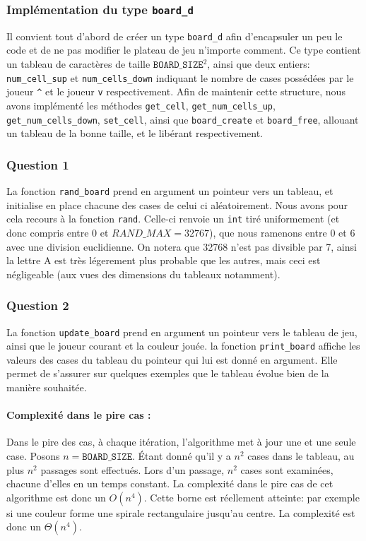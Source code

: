 \documentclass[12pt,a4paper,twoside]{article}
\begin{document}
\subsubsection*{Implémentation du type \texttt{board\_d}}
Il convient tout d'abord de créer un type \texttt{board\_d} afin
d'encapsuler un peu le code et de ne pas modifier le plateau de jeu
n'importe comment. Ce type contient un tableau de caractères de taille
\(\texttt{BOARD\_SIZE} ^{2}\), ainsi que deux entiers:
\texttt{num\_cell\_sup} et \texttt{num\_cells\_down} indiquant le nombre de
cases possédées par le joueur \texttt{\^} et le joueur \texttt{v} respectivement.
Afin de maintenir cette structure, nous avons implémenté les
méthodes \texttt{get\_cell}, \texttt{get\_num\_cells\_up},
\texttt{get\_num\_cells\_down}, \texttt{set\_cell}, ainsi que
\texttt{board\_create} et \texttt{board\_free}, allouant un tableau de
la bonne taille, et le libérant respectivement. 
\subsubsection*{Question 1}
\label{sec:orgheadline2}
La fonction \texttt{rand\_board} prend en argument un pointeur vers un
tableau, et initialise en place chacune des cases de celui ci
aléatoirement.  Nous avons pour cela recours à la fonction
\texttt{rand}. Celle-ci renvoie un \texttt{int} tiré uniformement (et
donc compris entre \(0\)
et \(RAND\_MAX = 32767\)),
que nous ramenons entre 0 et 6 avec une division euclidienne. On
notera que 32768 n'est pas divsible par 7, ainsi la lettre A est très
légerement plus probable que les autres, mais ceci est négligeable
(aux vues des dimensions du tableaux notamment).
\subsubsection*{Question 2}
\label{sec:orgheadline5}
La fonction \texttt{update\_board} prend en argument un pointeur vers
le tableau de jeu, ainsi que le joueur courant et la couleur jouée.
la fonction \texttt{print\_board} affiche les valeurs des cases du
tableau du pointeur qui lui est donné en argument. Elle permet de
s'assurer sur quelques exemples que le tableau évolue bien de la
manière souhaitée. 
\paragraph*{Complexité dans le pire cas :}
\label{sec:orgheadline3}
Dans le pire des cas, à chaque itération, l'algorithme met à jour une
et une seule case. Posons \(n = \texttt{BOARD\_SIZE}\). Étant donné qu'il y a \(n^{2}\)
cases dans le tableau, au plus \(n^{2}\) passages sont effectués. Lors d'un
passage, \(n^{2}\) cases sont examinées, chacune d'elles en un temps
constant. La complexité dans le pire cas de cet algorithme est donc un
\(O(n^4)\).
Cette borne est réellement atteinte: par exemple si une couleur forme
une spirale rectangulaire jusqu'au centre. La complexité est donc un
\(\Theta(n^{4})\). 
\end{document}
